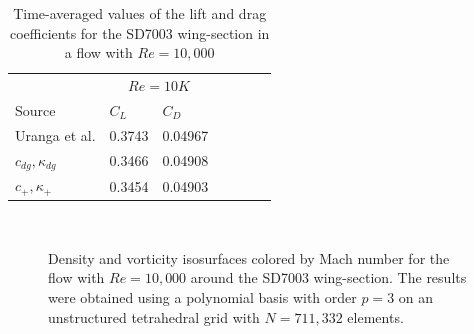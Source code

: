 \begin{table}[htbp]
\centering
\begin{tabular}{ l| l l| l l| l l} 
  
 &  \multicolumn{2}{|c|}{$Re = 10K$}  \\ 
 Source & $C_L$ & $C_D$    \\ 
\hline
 Uranga et al.\cite{uranga2011implicit} & 0.3743 & 0.04967   \\ 
$c_{dg},\kappa_{dg}$ & 0.3466 & 0.04908  \\ 
$c_{+},\kappa_{+}$ & 0.3454 & 0.04903 \\ 
 \end{tabular}
\caption{Time-averaged values of the lift and drag coefficients for the SD7003 wing-section in a flow with $Re = 10,000$}
\label{table:sdWingForce} 
 \end{table}


\begin{figure}[htbp]
\centering
{}
\\

\caption{Density and vorticity isosurfaces colored by Mach number for the flow with $Re = 10,000$ around the SD7003 wing-section. The results were obtained using a polynomial basis with order $p=3$ on an unstructured tetrahedral grid with $N = 711,332$ elements.}
\label{sdwingre10k}
\end{figure}


